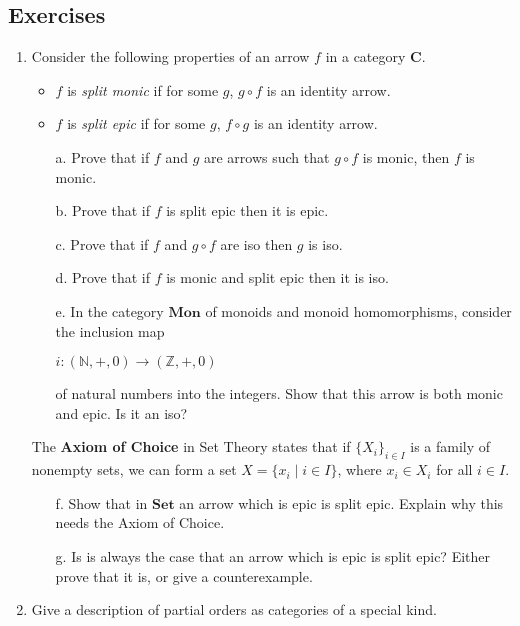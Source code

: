 \documentclass[]{amsbook}
\newcommand{\catname}[1]{\mathbf{#1}}
\newcommand{\N}{\mathbb{N}}
\newcommand{\Z}{\mathbb{Z}}
\newcommand{\0}{\mathbf{0}}
\newcommand{\1}{\mathbf{1}}
\begin{document}
\subsection*{Exercises}
\begin{enumerate}
    \item Consider the following properties of an arrow $f$ in a category
    $\catname{C}$.
    \begin{itemize}
        \item $f$ is \emph{split monic} if for some $g$, $g \circ f$ is an
        identity arrow.
        \item $f$ is \emph{split epic} if for some $g$, $f \circ g$ is an
        identity arrow.
    \end{itemize}
    \begin{itemize}
        \item[a.] Prove that if $f$ and $g$ are arrows such that $g \circ f$ is
        monic, then $f$ is monic.
        \item[b.] Prove that if $f$ is split epic then it is epic.
        \item[c.] Prove that if $f$ and $g \circ f$ are iso then $g$ is iso.
        \item[d.] Prove that if $f$ is monic and split epic then it is iso.
        \item[e.] In the category $\catname{Mon}$ of monoids and monoid
        homomorphisms, consider the inclusion map
        \begin{center}
            $i: (\N, +, 0) \to (\Z, +, 0)$
        \end{center}
        of natural numbers into the integers. Show that this arrow is both monic
        and epic. Is it an iso?
    \end{itemize}
    The \textbf{Axiom of Choice} in Set Theory states that if
    $\{ X_i \}_{i \in I}$ is a family of nonempty sets, we can form  a set
    $X = \{ x_i \mid i \in I \}$, where $x_i \in X_i$ for all $i \in I$.
    \begin{itemize}
        \item[f.] Show that in $\catname{Set}$ an arrow which is epic is split
        epic. Explain why this needs the Axiom of Choice.
        \item[g.] Is is always the case that an arrow which is epic is split
        epic? Either prove that it is, or give a counterexample.
    \end{itemize}

    \item Give a description of partial orders as categories of a special kind.
\end{enumerate}
\end{document}
